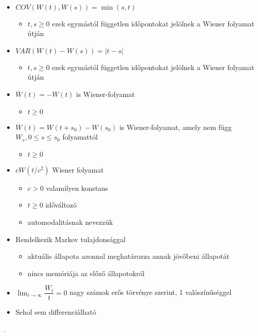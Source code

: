 \documentclass[11pt,a4paper]{article}
\begin{document}
				\paragraph{}
					\begin{itemize}
						  \item $COV(W(t), W(s)) = \min(s,t)$
						  \begin{itemize}
						   	\item $t,s \ge 0$ ezek egymástól független időpontokat jelölnek a Wiener folyamat útján
						  \end{itemize}
						  \item $VAR(W(t)-W(s))=|t-s|$
						  \begin{itemize}
						  	\item $t,s \ge 0$ ezek egymástól független időpontokat jelölnek a Wiener folyamat útján
						  \end{itemize}
						  \item $\overline{W}(t) = -W(t)$ is Wiener-folyamat
						  \begin{itemize}
						  	\item $t \ge 0$
						  \end{itemize}
						  \item $\overline{W}(t) = W(t+s_0) - W(s_0)$ is Wiener-folyamat, amely nem függ $W_s, 0 \le s \le s_0$ folyamattól
						  \begin{itemize}
						  	\item $t \ge 0$
						  \end{itemize}
						  \item $cW(t/c^2)$ Wiener folyamat
						  \begin{itemize}
						  	\item $c > 0$ valamilyen konstans
						  	\item $t \ge 0$ időváltozó
						  	\item automodalitásnak nevezzük
						  \end{itemize}
						  \item Rendelkezik Markov tulajdonsággal
						  \begin{itemize}
						 	  \item aktuális állapota azonnal meghatározza annak jövőbeni állapotát
						  	 \item nincs memóriája az előző állapotokról
						  \end{itemize}
						\item $\lim_{t \to \infty} \dfrac{W_t}{t}=0$ nagy számok erős törvénye szerint, 1 valószínűséggel
						\item Sehol sem differenciálható
					\end{itemize}.
\end{document}
